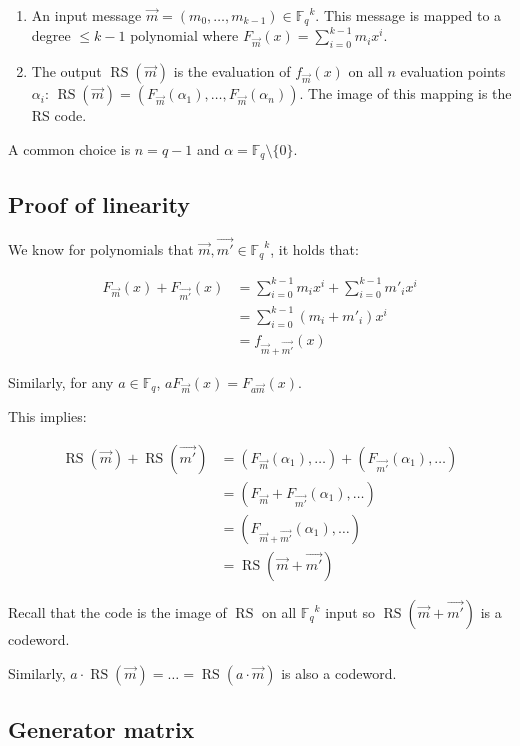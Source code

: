 \documentclass{idc_msc}
\newcommand{\Fq}[1][q]{{\mathbb{F}_{#1}}}
\DeclareMathOperator*{\RS}{RS}
\begin{document}
\begin{enumerate}
  \item An input message \(\vec{m} = (m_0,\ldots,m_{k-1}) \in \Fq^k\).
    This message is mapped to a degree \(\le k - 1\) polynomial where \(F_{\vec{m}}(x) = \sum_{i=0}^{k-1} m_i x^i\).
  \item The output \(\RS(\vec{m})\) is the evaluation of \(f_{\vec{m}}(x)\) on all \(n\) evaluation points \(\alpha_i\):
    \(\RS(\vec{m}) = (F_{\vec{m}}(\alpha_1),\ldots,F_{\vec{m}}(\alpha_n))\).
    The image of this mapping is the RS code.
\end{enumerate}

A common choice is \(n = q-1\) and \(\alpha = \Fq \setminus \{0\}\).

\subsection{Proof of linearity}

We know for polynomials that \(\vec{m},\vec{m'} \in \Fq^k\), it holds that:

\[
\begin{aligned}
F_{\vec{m}}(x) + F_{\vec{m'}}(x)
& = \sum_{i=0}^{k-1} m_i x^i + \sum_{i=0}^{k-1} m'_i x^i \\
& = \sum_{i=0}^{k-1} (m_i + m'_i) x^i \\
& = f_{\vec{m} + \vec{m'}}(x)
\end{aligned}
\]

Similarly, for any \(a \in \Fq\), \(aF_{\vec{m}}(x) = F_{a \vec{m}}(x)\).

This implies:

\[
\begin{aligned}
\RS(\vec{m}) + \RS(\vec{m'})
& = (F_{\vec{m}}(\alpha_1),\ldots) + (F_{\vec{m'}}(\alpha_1),\ldots) \\
& = (F_{\vec{m}} + F_{\vec{m'}}(\alpha_1),\ldots) \\
& = (F_{\vec{m} + \vec{m'}}(\alpha_1),\ldots) \\
& = \RS(\vec{m} + \vec{m'})
\end{aligned}
\]

Recall that the code is the image of \(\RS\) on all \(\Fq^k\) input so \(\RS(\vec{m} + \vec{m'})\) is a codeword.

Similarly, \(a \cdot \RS(\vec{m}) = \ldots = \RS(a \cdot \vec{m})\) is also a codeword.

\subsection{Generator matrix}
\end{document}
